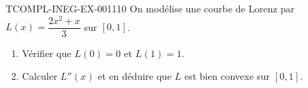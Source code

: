 \begin{exercice}{TCOMPL-INEG-EX-001}{1}{10}
On modélise une courbe de Lorenz par $L(x) = \dfrac{2x^2+x}{3}$ sur $[0,1]$.
\begin{enumerate}
  \item Vérifier que $L(0)=0$ et $L(1)=1$.
  \item Calculer $L''(x)$ et en déduire que $L$ est bien convexe sur $[0,1]$.
\end{enumerate}
\end{exercice}
